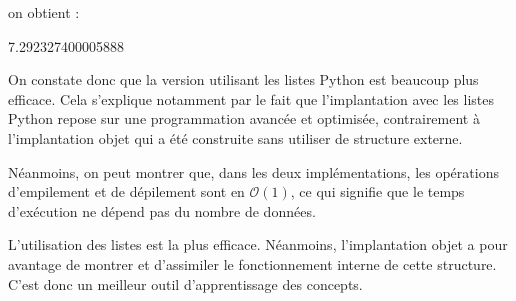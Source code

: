 \documentclass[
  a4paper,
  DIV=11,
  numbers=noendperiod]{scrartcl}
\newenvironment{Shaded}{\begin{snugshade}}{\end{snugshade}}
\newcommand{\FloatTok}[1]{\textcolor[rgb]{0.68,0.00,0.00}{#1}}
\begin{document}
\begin{tcolorbox}
on obtient :

\begin{Shaded}
\begin{Highlighting}[]
\FloatTok{7.292327400005888}
\end{Highlighting}
\end{Shaded}

On constate donc que la version utilisant les listes Python est beaucoup
plus efficace. Cela s'explique notamment par le fait que l'implantation
avec les listes Python repose sur une programmation avancée et
optimisée, contrairement à l'implantation objet qui a été construite
sans utiliser de structure externe.

Néanmoins, on peut montrer que, dans les deux implémentations, les
opérations d'empilement et de dépilement sont en \(\mathcal{O}(1)\), ce
qui signifie que le temps d'exécution ne dépend pas du nombre de
données.

L'utilisation des listes est la plus efficace. Néanmoins, l'implantation
objet a pour avantage de montrer et d'assimiler le fonctionnement
interne de cette structure. C'est donc un meilleur outil d'apprentissage
des concepts.

\end{tcolorbox}
\end{document}
